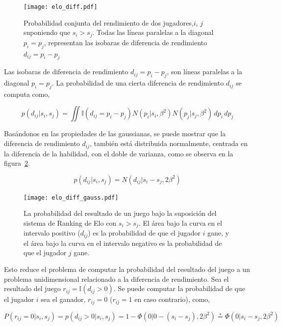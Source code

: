\documentclass[11pt,twoside,spanish]{report} %
\begin{document}
\begin{figure}[H]
	\centering
	\texttt{[image: elo\_diff.pdf]}
	\caption{Probabilidad conjunta del rendimiento de dos jugadores,$i$, $j$ suponiendo que $s_i>s_j$. Todas las l\'ineas paralelas a la diagonal $p_i=p_j$, representan las isobaras de diferencia de  rendimiento $d_{ij}=p_i-p_j$ }
	\label{fig:fig6}
\end{figure}

Las isobaras de diferencia de rendimiento $d_{ij} = p_i-p_j$, son l\'ineas paralelas a la diagonal $p_i=p_j$.
La probabilidad de una cierta diferencia de rendimiento $d_{ij}$ se computa como,

\begin{equation}\label{eq:ProbDiff}
p(d_{ij}|s_i,s_j) = \iint \mathbb{I}(d_{ij}=p_i -p_j) N(p_i|s_i,\beta^2)N(p_j|s_j,\beta^2) \, dp_i \, dp_j
\end{equation}

Bas\'andonos en las propiedades de las gaussianas, se puede mostrar que la diferencia de rendimiento $d_{ij}$, tambi\'en est\'a distribuida normalmente, centrada en la diferencia de la habilidad, con el doble de varianza, como se observa en la figura~\ref{fig:fig7}.

\begin{equation}\label{eq:ProbDiff2}
p(d_{ij}|s_i,s_j) = N(d_{ij}|s_i-s_j,2\beta^2)
\end{equation}

\begin{figure}[H]
	\centering
	\texttt{[image: elo\_diff\_gauss.pdf]}
	\caption{La probabilidad del resultado de un juego bajo la suposici\'on del sistema de Ranking de Elo con $s_i>s_j$. El \'area bajo la curva en el intervalo positivo ($d_{ij}$) es la probabilidad de que el jugador $i$ gane, y el \'area bajo la curva en el intervalo negativo es la probabilidad de que el jugador $j$ gane.}
	\label{fig:fig7}
\end{figure}

Esto reduce el problema de computar la probabilidad del resultado del juego a un problema unidimensional relacionado a la diferencia de rendimiento.
Sea el resultado del juego $r_{ij} = \mathbb{I}(d_{ij}>0)$.
Se puede computar la probabilidad de que el jugador $i$ sea el ganador, $r_{ij} = 0$ ($r_{ij} = 1$ en caso contrario), como,

\begin{equation}
P(r_{ij}=0|s_i,s_j) = p(d_{ij} > 0 | s_i, s_j) = 1 - \Phi \left(0|0 - (s_i - s_j),2\beta^2 \right) \overset{*}{=} \Phi \left(0|s_i - s_j,2\beta^2 \right)
\end{equation}
\end{document}

